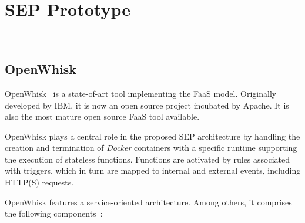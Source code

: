 \section{SEP Prototype}~\label{sec:prototype}





\subsection{OpenWhisk}

OpenWhisk~\cite{OpenWhisk} is a state-of-art tool implementing the FaaS model. Originally developed by IBM, it is now an open source project incubated by Apache. It is also the most mature open source FaaS tool available. 

OpenWhisk plays a central role in the proposed SEP architecture %
by handling the creation and termination of \textit{Docker} containers
with a specific runtime supporting the execution of stateless functions. Functions are activated by rules associated with triggers, which in turn are mapped to internal and external events, including HTTP(S) requests. %

OpenWhisk features a service-oriented architecture.
Among others, it comprises the following components~\cite{OpenWhisk}:

